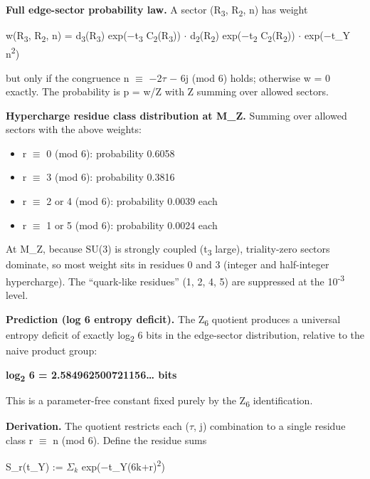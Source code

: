 \documentclass[11pt,a4paper]{article}
\theoremstyle{remark}
\providecommand{\tightlist}{%
  \setlength{\itemsep}{0pt}\setlength{\parskip}{0pt}}
\begin{document}
\textbf{Full edge-sector probability law.} A sector (R\textsubscript{3}, R\textsubscript{2}, n) has weight

w(R\textsubscript{3}, R\textsubscript{2}, n) = d\textsubscript{3}(R\textsubscript{3}) exp(\ensuremath{-}t\textsubscript{3} C\textsubscript{2}(R\textsubscript{3})) \ensuremath{\cdot} d\textsubscript{2}(R\textsubscript{2}) exp(\ensuremath{-}t\textsubscript{2} C\textsubscript{2}(R\textsubscript{2})) \ensuremath{\cdot} exp(\ensuremath{-}t\_Y n\textsuperscript{2})

but only if the congruence n \ensuremath{\equiv} \ensuremath{-}2\ensuremath{\tau} \ensuremath{-} 6j (mod 6) holds; otherwise w = 0 exactly. The probability is p = w/Z with Z summing over allowed sectors.

\textbf{Hypercharge residue class distribution at M\_Z.} Summing over allowed
sectors with the above weights:

\begin{itemize}
\tightlist
\item
  r \ensuremath{\equiv} 0 (mod 6): probability 0.6058
\item
  r \ensuremath{\equiv} 3 (mod 6): probability 0.3816
\item
  r \ensuremath{\equiv} 2 or 4 (mod 6): probability 0.0039 each
\item
  r \ensuremath{\equiv} 1 or 5 (mod 6): probability 0.0024 each
\end{itemize}

At M\_Z, because SU(3) is strongly coupled (t\textsubscript{3} large), triality-zero
sectors dominate, so most weight sits in residues 0 and 3 (integer and
half-integer hypercharge). The ``quark-like residues'' (1, 2, 4, 5) are
suppressed at the 10\textsuperscript{-3} level.

\textbf{Prediction (log 6 entropy deficit).} The Z\textsubscript{6} quotient produces a universal entropy deficit of exactly log\textsubscript{2} 6 bits in the edge-sector distribution, relative to the naive product group:

\textbf{log\textsubscript{2} 6 = 2.584962500721156\ldots{} bits}

This is a parameter-free constant fixed purely by the Z\textsubscript{6} identification.

\textbf{Derivation.} The quotient restricts each (\ensuremath{\tau}, j) combination to a single residue class r \ensuremath{\equiv} n (mod 6). Define the residue sums

S\_r(t\_Y) := \(\Sigma_k\) exp(\ensuremath{-}t\_Y(6k+r)\textsuperscript{2})
\end{document}
